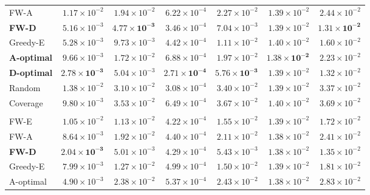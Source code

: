 \documentclass[letterpaper, 9
 pt, conference]{ieeeconf}
\begin{document}
\begin{table}[ht]
\begin{tabular}{lrrrrrr}
FW-A & $1.17\!\times\!10^{-2}$ & $1.94\!\times\!10^{-2}$ & $6.22\!\times\!10^{-4}$ & $2.27\!\times\!10^{-2}$ & $1.39\!\times\!10^{-2}$ & $2.44\!\times\!10^{-2}$ \\
\textbf{FW-D} & $5.16\!\times\!10^{-3}$ & $\mathbf{4.77\!\times\!10^{-3}}$ & $3.46\!\times\!10^{-4}$ & $7.04\!\times\!10^{-3}$ & $1.39\!\times\!10^{-2}$ & $\mathbf{1.31\!\times\!10^{-2}}$ \\
Greedy-E & $5.28\!\times\!10^{-3}$ & $9.73\!\times\!10^{-3}$ & $4.42\!\times\!10^{-4}$ & $1.11\!\times\!10^{-2}$ & $1.40\!\times\!10^{-2}$ & $1.60\!\times\!10^{-2}$ \\
\textbf{A-optimal} & $9.66\!\times\!10^{-3}$ & $1.72\!\times\!10^{-2}$ & $6.88\!\times\!10^{-4}$ & $1.97\!\times\!10^{-2}$ & $\mathbf{1.38\!\times\!10^{-2}}$ & $2.23\!\times\!10^{-2}$ \\
\textbf{D-optimal} & $\mathbf{2.78\!\times\!10^{-3}}$ & $5.04\!\times\!10^{-3}$ & $\mathbf{2.71\!\times\!10^{-4}}$ & $\mathbf{5.76\!\times\!10^{-3}}$ & $1.39\!\times\!10^{-2}$ & $1.32\!\times\!10^{-2}$ \\
Random & $1.38\!\times\!10^{-2}$ & $3.10\!\times\!10^{-2}$ & $3.08\!\times\!10^{-4}$ & $3.40\!\times\!10^{-2}$ & $1.39\!\times\!10^{-2}$ & $3.37\!\times\!10^{-2}$ \\
Coverage & $9.80\!\times\!10^{-3}$ & $3.53\!\times\!10^{-2}$ & $6.49\!\times\!10^{-4}$ & $3.67\!\times\!10^{-2}$ & $1.40\!\times\!10^{-2}$ & $3.69\!\times\!10^{-2}$ \\
\addlinespace[1pt]
\multicolumn{7}{l}{\textit{$K{=}40$}} \\[1pt]
FW-E & $1.05\!\times\!10^{-2}$ & $1.13\!\times\!10^{-2}$ & $4.22\!\times\!10^{-4}$ & $1.55\!\times\!10^{-2}$ & $1.39\!\times\!10^{-2}$ & $1.72\!\times\!10^{-2}$ \\
FW-A & $8.64\!\times\!10^{-3}$ & $1.92\!\times\!10^{-2}$ & $4.40\!\times\!10^{-4}$ & $2.11\!\times\!10^{-2}$ & $1.38\!\times\!10^{-2}$ & $2.41\!\times\!10^{-2}$ \\
\textbf{FW-D} & $\mathbf{2.04\!\times\!10^{-3}}$ & $5.01\!\times\!10^{-3}$ & $4.29\!\times\!10^{-4}$ & $5.43\!\times\!10^{-3}$ & $1.38\!\times\!10^{-2}$ & $1.35\!\times\!10^{-2}$ \\
Greedy-E & $7.99\!\times\!10^{-3}$ & $1.27\!\times\!10^{-2}$ & $4.99\!\times\!10^{-4}$ & $1.50\!\times\!10^{-2}$ & $1.39\!\times\!10^{-2}$ & $1.81\!\times\!10^{-2}$ \\
A-optimal & $4.90\!\times\!10^{-3}$ & $2.38\!\times\!10^{-2}$ & $5.37\!\times\!10^{-4}$ & $2.43\!\times\!10^{-2}$ & $1.38\!\times\!10^{-2}$ & $2.83\!\times\!10^{-2}$ \\

\end{tabular}
\end{table}
\end{document}

